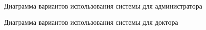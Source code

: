 \clearpage

\begin{figure}[!t]
	\caption{Диаграмма вариантов использования системы для администратора}
\end{figure}

\begin{figure}[!t]
	\caption{Диаграмма вариантов использования системы для доктора}
\end{figure}

